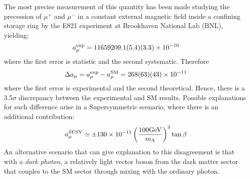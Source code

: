 The most precise measurement of this quantity has been made studying the precession of $\mu^+$ and $\mu^-$ in a constant external magnetic field inside a confining storage ring by the E821 experiment at Brookhaven National Lab (BNL), yielding:
\begin{equation}
a_{\mu}^{\rm exp} = 11659209.1(5.4)(3.3)\times 10^{-10}
\end{equation}
where the first error is statistic and the second systematic. Therefore
\begin{equation}
\Delta a_{\mu} = a_{\mu}^{\rm exp} - a_{\mu}^{\rm SM} = 268(63)(43)\times 10^{-11}
\end{equation}
where the first error is experimental and the second theoretical. Hence, there is a 3.5$\sigma$ discrepancy between the experimental and SM results. 
Possible explanations for such difference arise in a Supersymmetric scenario, where there is an additional contribution:
\begin{equation}
a_{\mu}^{\rm SUSY} \simeq \pm 130\times 10^{-11} \left( \frac{100 \rm GeV}{m_{\Lambda}} \right)^2 \tan{\beta}
\end{equation}
An alternative scenario that can give explanation to this disagreement is that with a \textit{dark photon}, a relatively light vector boson from the dark matter sector that couples to the SM sector through mixing with the ordinary photon. 

